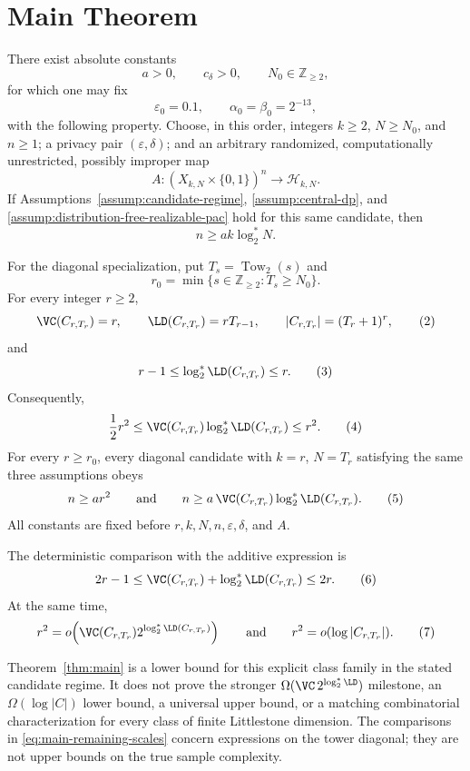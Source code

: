 \section{Main Theorem}\label{sec:main-theorem}

\begin{theorem}\label{thm:main}
There exist absolute constants
\[
a>0,
\qquad c_\delta>0,
\qquad N_0\in\mathbb Z_{\ge2},
\]
for which one may fix
\[
\varepsilon_0=0.1,
\qquad
\alpha_0=\beta_0=2^{-13},
\]
with the following property.  Choose, in this order, integers
$k\ge2$, $N\ge N_0$, and $n\ge1$; a privacy pair
$(\varepsilon,\delta)$; and an arbitrary randomized, computationally
unrestricted, possibly improper map
\[
A:(X_{k,N}\times\{0,1\})^n\longrightarrow\mathcal H_{k,N}.
\]
If Assumptions~\ref{assump:candidate-regime},
\ref{assump:central-dp}, and
\ref{assump:distribution-free-realizable-pac} hold for this same candidate,
then
\[
n\ge a k\log_2^*N.
\tag{1}\label{eq:main-nonasymptotic}
\]

For the diagonal specialization, put
$T_s=\operatorname{Tow}_2(s)$ and
\[
r_0=\min\{s\in\mathbb Z_{\ge2}:T_s\ge N_0\}.
\]
For every integer $r\ge2$,
\[
\VC(C_{r,T_r})=r,
\qquad
\LD(C_{r,T_r})=rT_{r-1},
\qquad
|C_{r,T_r}|=(T_r+1)^r,
\tag{2}\label{eq:main-structure}
\]
and
\[
r-1\le\log_2^*\LD(C_{r,T_r})\le r.
\tag{3}\label{eq:main-ld-logstar}
\]
Consequently,
\[
\frac12r^2
\le
\VC(C_{r,T_r})\log_2^*\LD(C_{r,T_r})
\le r^2.
\tag{4}\label{eq:main-product-scale}
\]
For every $r\ge r_0$, every diagonal candidate with
$k=r$, $N=T_r$ satisfying the same three assumptions obeys
\[
n\ge ar^2
\qquad\text{and}\qquad
n\ge a\,\VC(C_{r,T_r})\log_2^*\LD(C_{r,T_r}).
\tag{5}\label{eq:main-diagonal}
\]
All constants are fixed before $r,k,N,n,\varepsilon,\delta$, and $A$.

The deterministic comparison with the additive expression is
\[
2r-1
\le \VC(C_{r,T_r})+\log_2^*\LD(C_{r,T_r})
\le2r.
\tag{6}\label{eq:main-additive}
\]
At the same time,
\[
r^2=o\!\left(
\VC(C_{r,T_r})2^{\log_2^*\LD(C_{r,T_r})}
\right)
\qquad\text{and}\qquad
r^2=o(\log|C_{r,T_r}|).
\tag{7}\label{eq:main-remaining-scales}
\]
\end{theorem}

Theorem~\ref{thm:main} is a lower bound for this explicit class family in
the stated candidate regime.  It does not prove the stronger
$\Omega(\VC\,2^{\log_2^*\LD})$ milestone, an
$\Omega(\log|C|)$ lower bound, a universal upper bound, or a matching
combinatorial characterization for every class of finite Littlestone
dimension.  The comparisons in \eqref{eq:main-remaining-scales} concern
expressions on the tower diagonal; they are not upper bounds on the true
sample complexity.
